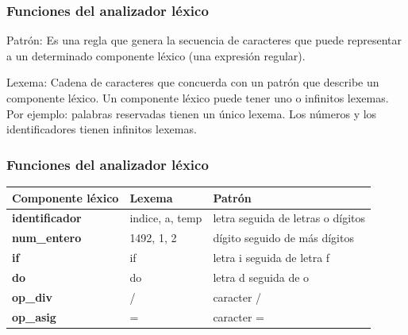 \documentclass{beamer}
\begin{document}
		\begin{frame}
			\frametitle{Funciones del analizador l\'exico}

			\begin{alertblock}{Patr\'on:}
			    Es una regla que genera la secuencia de caracteres que puede representar a un determinado componente l\'exico (una expresi\'on regular).
			\end{alertblock}
			\begin{alertblock}{Lexema:}
			    Cadena de caracteres que concuerda con un patr\'on que describe un componente l\'exico. Un componente l\'exico puede tener uno o infinitos lexemas. Por ejemplo: palabras reservadas tienen un \'unico lexema. Los n\'umeros y los identificadores tienen infinitos lexemas.
			\end{alertblock}
		\end{frame}		
		
		\begin{frame}
			\frametitle{Funciones del analizador l\'exico}

            \begin{table}
                \begin{center}
			         \begin{tabular}{|l|l|l|} \hline
			         \textbf{Componente l\'exico} & \textbf{Lexema} & \textbf{Patr\'on} \\ \hline \hline
			         \textbf{identificador} & indice, a, temp & letra seguida de letras o d\'igitos \\
			         \textbf{num\_entero} & 1492, 1, 2 & d\'igito seguido de m\'as d\'igitos \\
			         \textbf{if} & if & letra i seguida de letra f \\
                    \textbf{do} & do & letra d seguida de o \\
                    \textbf{op\_div} & / & caracter / \\
                    \textbf{op\_asig} & = & caracter = \\ \hline
			        \end{tabular}
			    \end{center}
			\end{table}
		\end{frame}				
\end{document}
